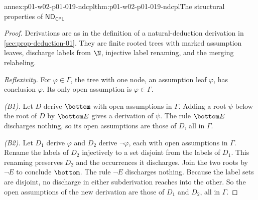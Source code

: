 \begin{annexitem}{annex:p01-w02-p01-019-ndcpl}{thm:p01-w02-p01-019-ndcpl}{The structural properties of \(\mathsf{ND}_{\mathsf{CPL}}\)}
\begin{proof}
Derivations are as in the definition of a natural-deduction derivation in
\cref{sec:prop-deduction-01}. They are finite rooted trees
with marked assumption leaves, discharge labels from \(\N\), injective label
renaming, and the merging relabeling.

\emph{Reflexivity.} For \(\varphi\in\Gamma\), the tree with one node, an
assumption leaf \(\varphi\), has conclusion \(\varphi\). Its only open
assumption is \(\varphi\in\Gamma\).

\emph{(B1).} Let \(D\) derive \(\bottom\) with open assumptions in
\(\Gamma\). Adding a root \(\psi\) below the root of \(D\) by \(\bottom E\)
gives a derivation of \(\psi\). The rule \(\bottom E\) discharges nothing, so
its open assumptions are those of \(D\), all in \(\Gamma\).

\emph{(B2).} Let \(D_1\) derive \(\varphi\) and \(D_2\) derive
\(\neg\varphi\), each with open assumptions in \(\Gamma\). Rename the labels
of \(D_2\) injectively to a set disjoint from the labels of \(D_1\). This
renaming preserves \(D_2\) and the occurrences it discharges. Join the two
roots by \(\neg E\) to conclude \(\bottom\). The rule \(\neg E\) discharges
nothing. Because the label sets are disjoint, no discharge in either
subderivation reaches into the other. So the open assumptions of the new
derivation are those of \(D_1\) and \(D_2\), all in \(\Gamma\).


\end{proof}
\end{annexitem}
